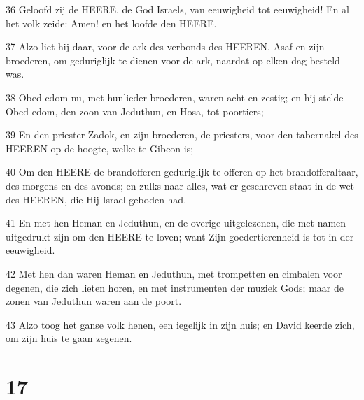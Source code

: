 \par 36 Geloofd zij de HEERE, de God Israels, van eeuwigheid tot eeuwigheid! En al het volk zeide: Amen! en het loofde den HEERE.
\par 37 Alzo liet hij daar, voor de ark des verbonds des HEEREN, Asaf en zijn broederen, om geduriglijk te dienen voor de ark, naardat op elken dag besteld was.
\par 38 Obed-edom nu, met hunlieder broederen, waren acht en zestig; en hij stelde Obed-edom, den zoon van Jeduthun, en Hosa, tot poortiers;
\par 39 En den priester Zadok, en zijn broederen, de priesters, voor den tabernakel des HEEREN op de hoogte, welke te Gibeon is;
\par 40 Om den HEERE de brandofferen geduriglijk te offeren op het brandofferaltaar, des morgens en des avonds; en zulks naar alles, wat er geschreven staat in de wet des HEEREN, die Hij Israel geboden had.
\par 41 En met hen Heman en Jeduthun, en de overige uitgelezenen, die met namen uitgedrukt zijn om den HEERE te loven; want Zijn goedertierenheid is tot in der eeuwigheid.
\par 42 Met hen dan waren Heman en Jeduthun, met trompetten en cimbalen voor degenen, die zich lieten horen, en met instrumenten der muziek Gods; maar de zonen van Jeduthun waren aan de poort.
\par 43 Alzo toog het ganse volk henen, een iegelijk in zijn huis; en David keerde zich, om zijn huis te gaan zegenen.

\chapter{17}

